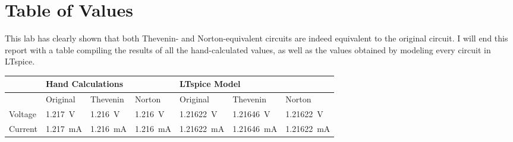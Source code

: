 \documentclass{article}
\begin{document}
\section{Table of Values} This lab has clearly shown
that both Thevenin- and Norton-equivalent circuits are indeed
equivalent to the original circuit. I will end this report
with a table compiling the results of all the hand-calculated
values, as well as the values obtained by modeling every
circuit in LTspice.

\begin{tabular}[l]{l | l l l | l l l}
    
    & \multicolumn{3}{l|}{Hand Calculations} & \multicolumn{3}{l}{LTspice Model}\\ \hline
    & Original & Thevenin & Norton & Original & Thevenin & Norton\\ \hline
    Voltage & \SI{1.217}{\volt} & \SI{1.216}{\volt} & \SI{1.216}{\volt} & \SI{1.21622}{\volt} & \SI{1.21646}{\volt} & \SI{1.21622}{\volt}\\
    Current & \SI{1.217}{\milli\ampere} & \SI{1.216}{\milli\ampere} & \SI{1.216}{\milli\ampere} & \SI{1.21622}{\milli\ampere} & \SI{1.21646}{\milli\ampere} & \SI{1.21622}{\milli\ampere}

\end{tabular}
\end{document}
